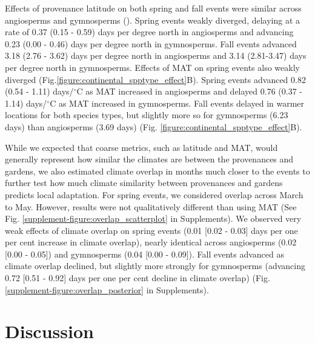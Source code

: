 \documentclass{article}
\begin{document}

Effects of provenance latitude on both spring and fall events were similar across angiosperms and gymnosperms (). Spring events weakly diverged, delaying at a rate of 0.37 (0.15 - 0.59) days per degree north in angiosperms and advancing 0.23 (0.00 - 0.46) days per degree north in gymnosperms. Fall events advanced 3.18 (2.76 - 3.62) days per degree north in angiosperms and 3.14 (2.81-3.47) days per degree north in gymnosperms.
Effects of MAT on spring events also weakly diverged (Fig.\ref{figure:continental_spptype_effect}B). Spring events advanced 0.82 (0.54 - 1.11) days/$^{\circ}$C as MAT increased in angiosperms and delayed 0.76 (0.37 - 1.14) days/$^{\circ}$C as MAT increased in gymnosperms. Fall events delayed in warmer locations for both species types, but slightly more so for gymnosperms (6.23 days) than angiosperms (3.69 days) (Fig. \ref{figure:continental_spptype_effect}B).

While we expected that coarse metrics, such as latitude and MAT, would generally represent how similar the climates are between the provenances and gardens, we also estimated climate overlap in months much closer to the events to further test how much climate similarity between provenances and gardens predicts local adaptation. For spring events, we considered overlap across March to May. However, results were not qualitatively different than using MAT (See Fig. \ref{supplement-figure:overlap_scatterplot} in Supplements). We observed very weak effects of climate overlap on spring events (0.01 [0.02 - 0.03] days per one per cent increase in climate overlap), nearly identical across angiosperms (0.02 [0.00 - 0.05]) and gymnosperms (0.04 [0.00 - 0.09]). Fall events advanced as climate overlap declined, but slightly more strongly for gymnosperms (advancing 0.72 [0.51 - 0.92] days per one per cent decline in climate overlap) (Fig.\ref{supplement-figure:overlap_posterior} in Supplements).


\section{Discussion}
\end{document}
